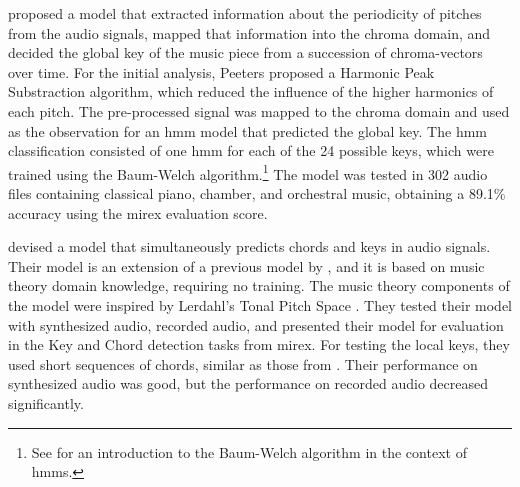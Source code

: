 \textcite{peeters2006chromabased} proposed a model that
extracted information about the periodicity of pitches from
the audio signals, mapped that information into the chroma
domain, and decided the global key of the music piece from a
succession of chroma-vectors over time. For the initial
analysis, Peeters proposed a Harmonic Peak Substraction
algorithm, which reduced the influence of the higher
harmonics of each pitch. The pre-processed signal was mapped
to the chroma domain and used as the observation for an
\gls{hmm} model that predicted the global key. The \gls{hmm}
classification consisted of one \gls{hmm} for each of the 24
possible keys, which were trained using the Baum-Welch
algorithm.\footnote{See \textcite{rabiner1989tutorial} for
an introduction to the Baum-Welch algorithm in the context
of \glspl{hmm}.} The model was tested in 302 audio files
containing classical piano, chamber, and orchestral music,
obtaining a 89.1\% accuracy using the \gls{mirex} evaluation
score.




\textcite{catteau2007probabilistic} devised a model that
simultaneously predicts chords and keys in audio signals.
Their model is an extension of a previous model by
\textcite{bello2005robust}, and it is based on music theory
domain knowledge, requiring no training. The music theory
components of the model were inspired by Lerdahl's Tonal
Pitch Space \parencite{lerdahl2005tonal}. They tested their
model with synthesized audio, recorded audio, and presented
their model for evaluation in the Key and Chord detection
tasks from \gls{mirex}. For testing the local keys, they
used short sequences of chords, similar as those from
\textcite{krumhansl1982tracing}. Their performance on
synthesized audio was good, but the performance on recorded
audio decreased significantly.

